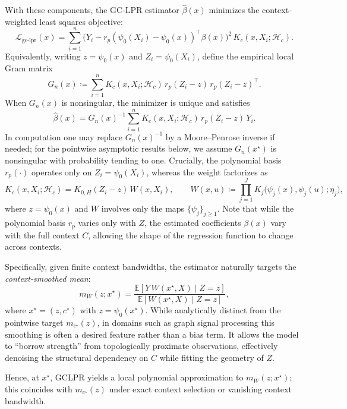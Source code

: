 \documentclass[final,1p,times,authoryear]{elsarticle}
\newcommand{\Lcal}{\mathcal{L}}
\newcommand{\Hcal}{\mathcal{H}}
\begin{document}
With these components, the GC-LPR estimator $\hat\beta(x)$ minimizes the context-weighted least squares objective:
\begin{equation}
\label{eq:gc_lpr_loss}
\Lcal_{\text{gc-lpr}}(x)
=\sum_{i=1}^{n}\Big(Y_i-r_p(\psi_0(X_i)-\psi_0(x))^\top\beta(x)\Big)^2\,K_c(x,X_i;\Hcal_c).
\end{equation}
Equivalently, writing \(z=\psi_0(x)\) and \(Z_i=\psi_0(X_i)\), define the empirical local Gram matrix
\[
G_n(x)\coloneqq \sum_{i=1}^{n} K_c(x,X_i;\Hcal_c)\, r_p(Z_i-z)\,r_p(Z_i-z)^\top.
\]
When \(G_n(x)\) is nonsingular, the minimizer is unique and satisfies
\[
\hat\beta(x)=G_n(x)^{-1}\sum_{i=1}^{n} K_c(x,X_i;\Hcal_c)\, r_p(Z_i-z)\,Y_i.
\]
In computation one may replace \(G_n(x)^{-1}\) by a Moore--Penrose inverse if needed; for the pointwise asymptotic results below, we assume \(G_n(x^\star)\) is nonsingular with probability tending to one.
Crucially, the polynomial basis $r_p(\cdot)$ operates only on $Z_i=\psi_0(X_i)$, whereas the weight factorizes as
\[
K_c(x,X_i;\Hcal_c)=K_{0,H}(Z_i-z)\,W(x,X_i),
\qquad
W(x,u)\coloneqq \prod_{j=1}^{J} K_j\!\big(\psi_j(x),\psi_j(u);\eta_j\big),
\]
where $z=\psi_0(x)$ and $W$ involves only the maps $\{\psi_j\}_{j \ge 1}$. Note that while the polynomial basis $r_p$ varies only with $Z$, the estimated coefficients $\beta(x)$ vary with the full context $C$, allowing the shape of the regression function to change across contexts.

Specifically, given finite context bandwidths, the estimator naturally targets the \emph{context-smoothed mean}:
\[
m_W(z;x^\star) = \frac{\mathbb{E}[Y \, W(x^\star, X) \mid Z=z]}{\mathbb{E}[W(x^\star, X) \mid Z=z]},
\]
where $x^\star=(z,c^\star)$ with $z=\psi_0(x^\star)$. While analytically distinct from the pointwise target $m_{c^\star}(z)$, in domains such as graph signal processing this smoothing is often a desired feature rather than a bias term. It allows the model to ``borrow strength'' from topologically proximate observations, effectively denoising the structural dependency on $C$ while fitting the geometry of $Z$.

Hence, at $x^\star$, GC\text{-}LPR yields a local polynomial approximation to $m_W(z;x^\star)$; this coincides with $m_{c^\star}(z)$ under exact context selection or vanishing context bandwidth.
\end{document}
